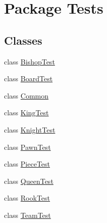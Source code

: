 \hypertarget{namespace_tests}{}\section{Package Tests}
\label{namespace_tests}
\subsection*{Classes}
\begin{DoxyCompactItemize}
\item 
class \hyperlink{class_tests_1_1_bishop_test}{Bishop\+Test}
\item 
class \hyperlink{class_tests_1_1_board_test}{Board\+Test}
\item 
class \hyperlink{class_tests_1_1_common}{Common}
\item 
class \hyperlink{class_tests_1_1_king_test}{King\+Test}
\item 
class \hyperlink{class_tests_1_1_knight_test}{Knight\+Test}
\item 
class \hyperlink{class_tests_1_1_pawn_test}{Pawn\+Test}
\item 
class \hyperlink{class_tests_1_1_piece_test}{Piece\+Test}
\item 
class \hyperlink{class_tests_1_1_queen_test}{Queen\+Test}
\item 
class \hyperlink{class_tests_1_1_rook_test}{Rook\+Test}
\item 
class \hyperlink{class_tests_1_1_team_test}{Team\+Test}
\end{DoxyCompactItemize}
